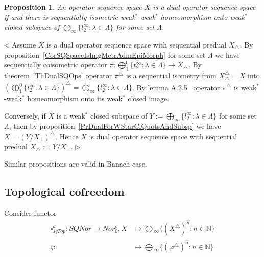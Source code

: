 \documentclass[12pt]{article}
\newtheorem{proposition}[theorem]{Proposition}
\newenvironment{proof}{\par $\triangleleft$}{$\triangleright$}
\begin{document}
\begin{proposition}\label{PrCharacDualSQSp} An operator sequence space $X$ 
is a dual operator sequence space if and there is sequentially isometric 
weak${}^*$-weak${}^*$ homeomorphism onto weak${}^*$ closed 
subspace of $\bigoplus_\infty \{l_2^\infty:\lambda\in\Lambda \}$ 
for some set $\Lambda$.
\end{proposition}
\begin{proof}
Assume $X$ is a dual operator sequence space with sequential 
predual $X_\triangle$. By proposition~\ref{CorSQSpaceIsImgMetrAdmEpiMorph} for 
some set $\Lambda$ we have sequentially coisometric 
operator $\pi:\bigoplus_1^0 \{t_2^\infty:\lambda\in\Lambda \}\to X_\triangle$. 
By theorem~\ref{ThDualSQOps} operator $\pi^\triangle$ is a sequential isometry 
from $X_\triangle^\triangle=X$ 
into ${(\bigoplus_1^0 \{t_2^\infty:\lambda\in\Lambda \})}^\triangle
=\bigoplus_\infty \{l_2^\infty:\lambda\in\Lambda \}$. 
By lemma A.2.5~\cite{BleOpAlgAndMods} operator $\pi^\triangle$ is 
weak${}^*$-weak${}^*$ homeomorphism onto its weak${}^*$ closed image.

Conversely, if $X$ is a weak${}^*$ closed subspace of 
$Y:=\bigoplus_\infty \{l_2^\infty:\lambda\in\Lambda \}$  for some 
set $\Lambda$, then by proposition~\ref{PrDualForWStarClQuotsAndSubsp} we 
have $X={(Y/X_\perp)}^\triangle$. Hence $X$ is dual operator sequence space 
with sequential predual $X_\triangle:=Y/X_\perp$.
\end{proof}

Similar propositions are valid in Banach case.






























\subsection{Topological cofreedom}

Consider functor
$$
\begin{aligned}
\square_{sqTop}^d : SQNor \to Nor_0^o, X &\mapsto \bigoplus{}_\infty
 \{{(X^{\triangle })}^{\wideparen{n}} : n \in \mathbb{N} \} \\
\varphi&\mapsto\bigoplus{}_\infty  \{
    {(\varphi^\triangle )}^{\wideparen{n}}:n\in\mathbb{N}
 \}
\end{aligned}
$$
\end{document}
